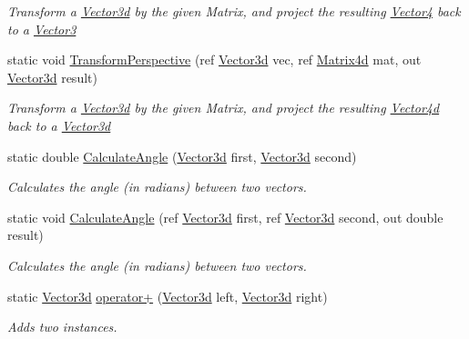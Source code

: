 \begin{DoxyCompactItemize}
\begin{DoxyCompactList}\small\item\em Transform a \hyperlink{struct_open_t_k_1_1_vector3d}{Vector3d} by the given Matrix, and project the resulting \hyperlink{struct_open_t_k_1_1_vector4}{Vector4} back to a \hyperlink{struct_open_t_k_1_1_vector3}{Vector3} \end{DoxyCompactList}\item 
static void \hyperlink{struct_open_t_k_1_1_vector3d_a8f7a7ad8674db5e6b3937dd6f9902910}{Transform\-Perspective} (ref \hyperlink{struct_open_t_k_1_1_vector3d}{Vector3d} vec, ref \hyperlink{struct_open_t_k_1_1_matrix4d}{Matrix4d} mat, out \hyperlink{struct_open_t_k_1_1_vector3d}{Vector3d} result)
\begin{DoxyCompactList}\small\item\em Transform a \hyperlink{struct_open_t_k_1_1_vector3d}{Vector3d} by the given Matrix, and project the resulting \hyperlink{struct_open_t_k_1_1_vector4d}{Vector4d} back to a \hyperlink{struct_open_t_k_1_1_vector3d}{Vector3d}\end{DoxyCompactList}\item 
static double \hyperlink{struct_open_t_k_1_1_vector3d_aef221b17efd144a5da84bb8827e46d20}{Calculate\-Angle} (\hyperlink{struct_open_t_k_1_1_vector3d}{Vector3d} first, \hyperlink{struct_open_t_k_1_1_vector3d}{Vector3d} second)
\begin{DoxyCompactList}\small\item\em Calculates the angle (in radians) between two vectors. \end{DoxyCompactList}\item 
static void \hyperlink{struct_open_t_k_1_1_vector3d_a6c5209a6296a2d3dd6f0be6e64dc1209}{Calculate\-Angle} (ref \hyperlink{struct_open_t_k_1_1_vector3d}{Vector3d} first, ref \hyperlink{struct_open_t_k_1_1_vector3d}{Vector3d} second, out double result)
\begin{DoxyCompactList}\small\item\em Calculates the angle (in radians) between two vectors.\end{DoxyCompactList}\item 
static \hyperlink{struct_open_t_k_1_1_vector3d}{Vector3d} \hyperlink{struct_open_t_k_1_1_vector3d_a9c1682494023790eb13cec857d4a95d6}{operator+} (\hyperlink{struct_open_t_k_1_1_vector3d}{Vector3d} left, \hyperlink{struct_open_t_k_1_1_vector3d}{Vector3d} right)
\begin{DoxyCompactList}\small\item\em Adds two instances. \end{DoxyCompactList}\item 

\end{DoxyCompactItemize}
